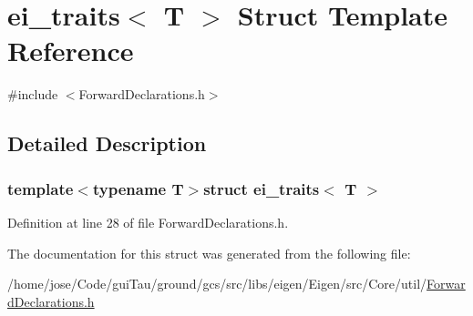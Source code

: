\hypertarget{structei__traits}{\section{ei\-\_\-traits$<$ T $>$ Struct Template Reference}
\label{structei__traits}
}


{\ttfamily \#include $<$Forward\-Declarations.\-h$>$}



\subsection{Detailed Description}
\subsubsection*{template$<$typename T$>$struct ei\-\_\-traits$<$ T $>$}



Definition at line 28 of file Forward\-Declarations.\-h.



The documentation for this struct was generated from the following file\-:\begin{DoxyCompactItemize}
\item 
/home/jose/\-Code/gui\-Tau/ground/gcs/src/libs/eigen/\-Eigen/src/\-Core/util/\hyperlink{_forward_declarations_8h}{Forward\-Declarations.\-h}\end{DoxyCompactItemize}
